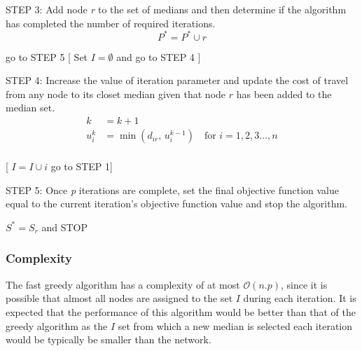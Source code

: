 \documentclass[11pt]{article}
\begin{document}
	\begin{algorithm}
		\begin{algorithmic}[0]
			
			\Statex
			\Statex STEP 3: Add node \emph{r} to the set of medians and then determine if the algorithm has completed the number of required iterations.
			\begin{equation*}
			P^* = P^* \cup r
			\end{equation*}
			
			\Statex go to STEP 5
			[
			\Else
			\Statex Set $I = \emptyset$ and go to STEP 4
			]
			\EndIf
			
			
			\Statex
			\Statex STEP 4: Increase the value of iteration parameter and update the cost of travel from any node to its closet median given that node $r$ has been added to the median set.
			\begin{align*}
			k &= k+1\\
			u_i^k &= \min(d_{ir} \text{, } u_i^{k-1}) \quad \text{for } i = 1,2,3 \dots,n\\
			\end{align*}
			
			[
			\Statex $I=I\cup i$
			\Statex go to STEP 1]
			\EndIf
			
			\Statex
			\Statex STEP 5: Once \emph{p} iterations are complete, set the final objective function value equal to the current iteration's objective function value and stop the algorithm.
			\begin{center}
				$S^{*} = S_r$ and STOP
			\end{center}
			
		\end{algorithmic}
	\end{algorithm}
	
	\subsubsection{Complexity}
	The fast greedy algorithm has a complexity of at most $\mathcal{O}(n.p)$, since it is possible that almost all nodes are assigned to the set $I$ during each iteration.  It is expected that the performance of this algorithm would be better than that of the greedy algorithm as the $I$ set from which a new median is selected each iteration would be typically be smaller than the network.
	
\end{document}
